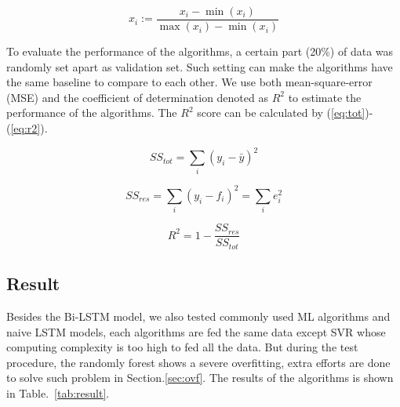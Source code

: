 \documentclass[conference, a4paper]{IEEEtran}
\begin{document}
    \begin{equation}
    x_i := \frac{x_i-\min \left( x_i \right)}{\max \left( x_i \right) -\min \left( x_i \right)}
    \label{eq:standarlize}
    \end{equation}

    To evaluate the performance of the algorithms, a certain part (20\%) of data was randomly set apart as validation set. Such setting can make the algorithms have the same baseline to compare to each other. We use both mean-square-error (MSE) and the coefficient of determination denoted as $R^2$ to estimate the performance of the algorithms. The $R^2$ score can be calculated by (\ref{eq:tot})-(\ref{eq:r2}).

    \begin{equation}
      SS_{tot} = \sum_{i}(y_i-\bar{y})^2
      \label{eq:tot}
    \end{equation}

    \begin{equation}
      SS_{res} = \sum_{i}(y_i-f_i)^2=\sum_ie_i^2
      \label{eq:res}
    \end{equation}

    \begin{equation}
      R^2 = 1-\frac{SS_{res}}{SS_{tot}}
      \label{eq:r2}
    \end{equation}

\subsection{Result}
  Besides the Bi-LSTM model, we also tested commonly used ML algorithms and naive LSTM models, each algorithms are fed the same data except SVR whose computing complexity is too high to fed all the data\cite{clarkeAnalysisSupportVector2005}. But during the test procedure, the randomly forest shows a severe overfitting, extra efforts are done to solve such problem in Section.\ref{sec:ovf}. The results of the algorithms is shown in Table.~\ref{tab:result}.
\end{document}
